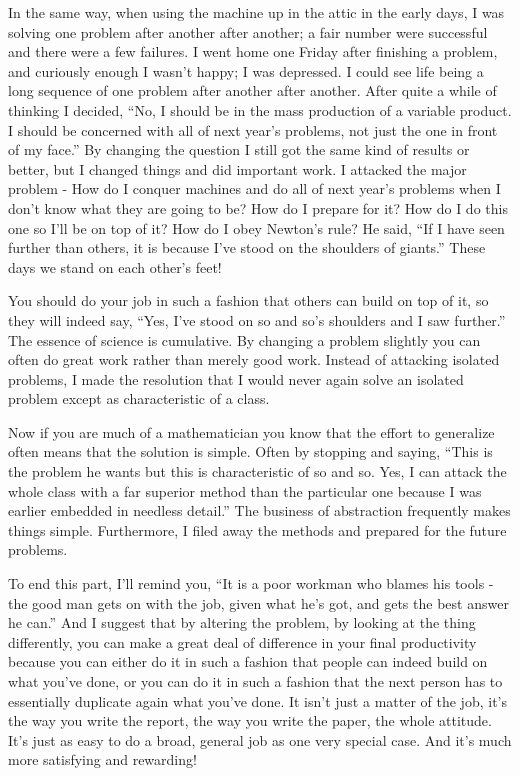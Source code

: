 \documentclass{article}
\begin{document}
In the same way, when using the machine up in the attic in the early days, I was solving one problem after another after another; a fair number were successful and there were a few failures. I went home one Friday after finishing a problem, and curiously enough I wasn't happy; I was depressed. I could see life being a long sequence of one problem after another after another. After quite a while of thinking I decided, ``No, I should be in the mass production of a variable product. I should be concerned with all of next year's problems, not just the one in front of my face.'' By changing the question I still got the same kind of results or better, but I changed things and did important work. I attacked the major problem - How do I conquer machines and do all of next year's problems when I don't know what they are going to be? How do I prepare for it? How do I do this one so I'll be on top of it? How do I obey Newton's rule? He said, ``If I have seen further than others, it is because I've stood on the shoulders of giants.'' These days we stand on each other's feet!

You should do your job in such a fashion that others can build on top of it, so they will indeed say, ``Yes, I've stood on so and so's shoulders and I saw further.'' The essence of science is cumulative. By changing a problem slightly you can often do great work rather than merely good work. Instead of attacking isolated problems, I made the resolution that I would never again solve an isolated problem except as characteristic of a class.

Now if you are much of a mathematician you know that the effort to generalize often means that the solution is simple. Often by stopping and saying, ``This is the problem he wants but this is characteristic of so and so. Yes, I can attack the whole class with a far superior method than the particular one because I was earlier embedded in needless detail.'' The business of abstraction frequently makes things simple. Furthermore, I filed away the methods and prepared for the future problems.

To end this part, I'll remind you, ``It is a poor workman who blames his tools - the good man gets on with the job, given what he's got, and gets the best answer he can.'' And I suggest that by altering the problem, by looking at the thing differently, you can make a great deal of difference in your final productivity because you can either do it in such a fashion that people can indeed build on what you've done, or you can do it in such a fashion that the next person has to essentially duplicate again what you've done. It isn't just a matter of the job, it's the way you write the report, the way you write the paper, the whole attitude. It's just as easy to do a broad, general job as one very special case. And it's much more satisfying and rewarding!
\end{document}
